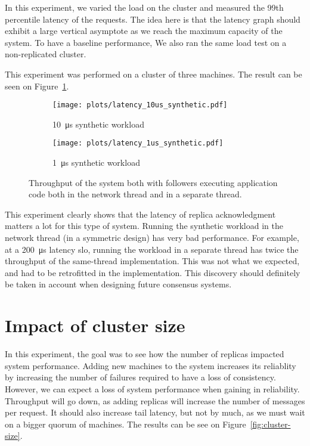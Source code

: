 In this experiment, we varied the load on the cluster and measured the 99th percentile latency of the requests.
The idea here is that the latency graph should exhibit a large vertical asymptote as we reach the maximum capacity of the system. 
To have a baseline performance, We also ran the same load test on a non-replicated cluster.

This experiment was performed on a cluster of three machines.
The result can be seen on Figure~\ref{fig:latency-throughput}.

\begin{figure}[p]
    \centering
    \begin{subfigure}[t]{0.8\textwidth}
        \texttt{[image: plots/latency\_10us\_synthetic.pdf]}
        \caption{\SI{10}{\micro\second} synthetic workload}
    \end{subfigure}

    \begin{subfigure}[t]{0.8\textwidth}
        \texttt{[image: plots/latency\_1us\_synthetic.pdf]}
        \caption{\SI{1}{\micro\second} synthetic workload}
    \end{subfigure}
    \caption{
        Throughput of the system both with followers executing application code both in the network thread and in a separate thread. 
        \label{fig:latency-throughput}
    }
\end{figure}

This experiment clearly shows that the latency of replica acknowledgment matters a lot for this type of system.
Running the synthetic workload in the network thread (in a symmetric design) has very bad performance.
For example, at a \SI{200}{\micro\second} latency \gls{slo}, running the workload in a separate thread has twice the throughput of the same-thread implementation.
This was not what we expected, and had to be retrofitted in the implementation.
This discovery should definitely be taken in account when designing future consensus systems.

\section{Impact of cluster size}


In this experiment, the goal was to see how the number of replicas impacted system performance.
Adding new machines to the system increases its reliablity by increasing the number of failures required to have a loss of consistency.
However, we can expect a loss of system performance when gaining in reliability.
Throughput will go down, as adding replicas will increase the number of messages per request.
It should also increase tail latency, but not by much, as we must wait on a bigger quorum of machines.
The results can be see on Figure~\ref{fig:cluster-size}.

